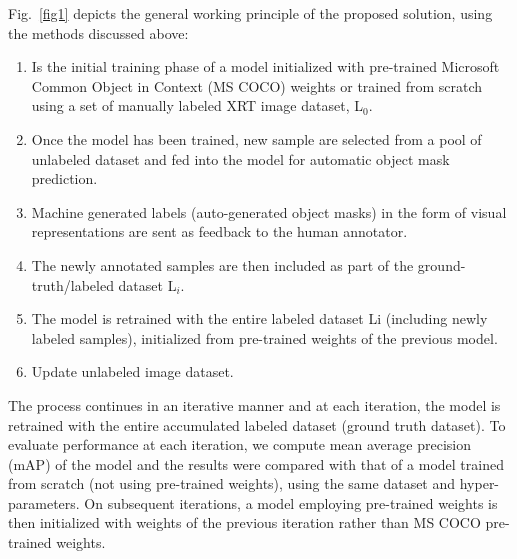 \documentclass[conference]{IEEEtran}
\begin{document}
		
		Fig.~\ref{fig1} depicts the general working principle of the proposed solution, using the methods discussed above:\\

		\begin{enumerate}
			\item Is the initial training phase of a model initialized with pre-trained Microsoft Common Object in Context (MS COCO) weights or trained from scratch using a set of manually labeled XRT image dataset, L$ _{0} $.
			\item Once the model has been trained, new sample are selected from a pool of unlabeled dataset and fed into the model for automatic object mask prediction.
			\item Machine generated labels (auto-generated object masks) in the form of visual representations are sent as feedback to the human annotator.
			\item The newly annotated samples are then included as part of the ground-truth/labeled dataset L$ _{i} $.
			\item The model is retrained with the entire labeled dataset Li (including newly labeled samples), initialized from pre-trained weights of the previous model.
			\item Update unlabeled image dataset.\\
		\end{enumerate}
	
	  The process continues in an iterative manner and at each iteration,
the model is retrained with the entire accumulated labeled dataset (ground truth dataset).
To evaluate performance at each iteration, we compute mean average precision (mAP) of
the model and the results were compared with that of a model trained from scratch (not
using pre-trained weights), using the same dataset and hyper-parameters. On subsequent
iterations, a model employing pre-trained weights is then initialized with weights of the
previous iteration rather than MS COCO pre-trained weights.
		
\end{document}

